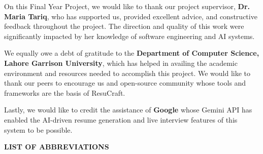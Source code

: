 \documentclass[12pt, a4paper, oneside]{report}
\begin{document}
On this Final Year Project, we would like to thank our project supervisor, \textbf {Dr. Maria Tariq}, who has supported us, provided excellent advice, and constructive feedback throughout the project. The direction and quality of this work were significantly impacted by her knowledge of software engineering and AI systems.

We equally owe a debt of gratitude to the \textbf{Department of Computer Science, Lahore Garrison University}, which has helped in availing the academic environment and resources needed to accomplish this project. We would like to thank our peers to encourage us and open-source community whose tools and frameworks are the basis of ResuCraft.

Lastly, we would like to credit the assistance of \textbf{Google} whose Gemini API has enabled the AI-driven resume generation and live interview features of this system to be possible.

\newpage
\tableofcontents

\newpage
\listoftables

\newpage
\listoffigures

\newpage
\begin{center}
  {\Large \textbf{LIST OF ABBREVIATIONS}}
\end{center}
\end{document}
